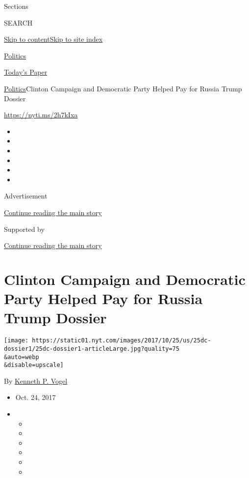 Sections

SEARCH

\protect\hyperlink{site-content}{Skip to
content}\protect\hyperlink{site-index}{Skip to site index}

\href{https://www.nytimes.com/section/politics}{Politics}

\href{https://myaccount.nytimes.com/auth/login?response_type=cookie\&client_id=vi}{}

\href{https://www.nytimes.com/section/todayspaper}{Today's Paper}

\href{/section/politics}{Politics}\textbar{}Clinton Campaign and
Democratic Party Helped Pay for Russia Trump Dossier

\url{https://nyti.ms/2h7kIxa}

\begin{itemize}
\item
\item
\item
\item
\item
\item
\end{itemize}

Advertisement

\protect\hyperlink{after-top}{Continue reading the main story}

Supported by

\protect\hyperlink{after-sponsor}{Continue reading the main story}

\hypertarget{clinton-campaign-and-democratic-party-helped-pay-for-russia-trump-dossier}{%
\section{Clinton Campaign and Democratic Party Helped Pay for Russia
Trump
Dossier}\label{clinton-campaign-and-democratic-party-helped-pay-for-russia-trump-dossier}}

\texttt{[image: https://static01.nyt.com/images/2017/10/25/us/25dc-dossier1/25dc-dossier1-articleLarge.jpg?quality=75\\\&auto=webp\\\&disable=upscale]}

By \href{https://www.nytimes.com/by/kenneth-p-vogel}{Kenneth P. Vogel}

\begin{itemize}
\item
  Oct. 24, 2017
\item
  \begin{itemize}
  \item
  \item
  \item
  \item
  \item
  \item
  \end{itemize}
\end{itemize}

